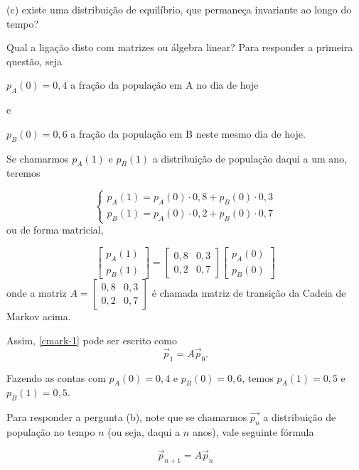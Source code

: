 (c) existe uma distribuição de equilíbrio, que permaneça invariante ao longo do tempo?

\medskip
Qual a ligação disto com matrizes ou álgebra linear?
Para responder a primeira questão, seja
\medskip

$p_A(0)=0,4$ a fração da população em A no dia de hoje

e

$p_B(0)=0,6$ a fração da população em B neste mesmo dia de hoje.

Se chamarmos $p_A(1)$ e $p_B(1)$ a distribuição de população daqui a um ano, teremos

\begin{equation}\label{cmark-1}
\begin{cases}
p_A(1)=p_A(0) \cdot 0,8 + p_B(0) \cdot 0,3 \\
p_B(1)=p_A(0) \cdot 0,2 + p_B(0) \cdot 0,7
\end{cases}
\end{equation}
ou de forma  matricial,

$$\left[ \begin{array}{c} p_A(1)
\\ p_B(1)
\end{array} \right]  =
\left[ \begin{array}{cc} 0,8 & 0,3
\\ 0,2 & 0,7
\end{array} \right]
\left[ \begin{array}{c} p_A(0)
\\ p_B(0)
\end{array} \right]  $$
onde a matriz $A=\left[ \begin{array}{cc} 0,8 & 0,3
\\ 0,2 & 0,7
\end{array} \right]$
é chamada matriz de transição da Cadeia de Markov acima.

Assim, \eqref{cmark-1} pode ser escrito como
\begin{equation} \vec p_1 = A \vec p_0.\end{equation}

Fazendo as contas com $p_A(0)=0,4$ e $p_B(0)=0,6$, temos $p_A(1)=0,5$ e $p_B(1)=0,5$.

\medskip

Para responder a pergunta (b), note que se chamarmos $\vec{p_n}$ a distribuição de população no tempo $n$ (ou seja, daqui a $n$ anos), vale seguinte fórmula

\begin{equation}\label{cmark-2}
\vec p_{n+1} = A \vec p_n
\end{equation}

